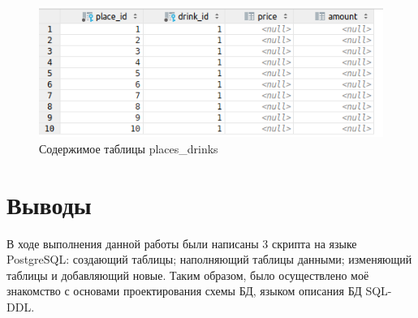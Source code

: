 \begin{figure}[H]
	\begin{center}
		\includegraphics[scale=0.5]{./pics/places_drinks.png}
		\caption{Содержимое таблицы places\_drinks} 
		\label{pic:places_drinks} %
	\end{center}
\end{figure}

\newpage
\section{Выводы}

В ходе выполнения данной работы были написаны 3 скрипта на языке PostgreSQL: создающий таблицы; наполняющий таблицы данными; изменяющий таблицы и добавляющий новые.
Таким образом, было осуществлено моё знакомство с основами проектирования схемы БД, языком описания БД SQL-DDL.



